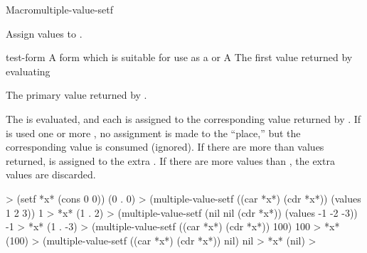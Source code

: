 \documentclass[10pt,twoside,english,pdftex]{article}
\begin{document}

\begin{functiondoc}{Macro}{multiple-value-setf}{%
  
 \returns{} } 
  
\fnsyntax

\fnpurpose Assign values to .

\fnpackage {}

\fnmodule {}

\fnargs
\begin{args}{test-form}
\arg[place] A form which is suitable for use as a
   or \nil 
\arg[form] A 
 The first value returned by evaluating 
\end{args}

\fnreturns The primary value returned by .

\fndescription
% 
The  is evaluated, and each  is assigned to the
corresponding value returned by .  If \nil{} is used one or more
, no assignment is made to the \nil{} ``place,'' but the
corresponding value is consumed (ignored). If there are more 
than values returned, \nil{} is assigned to the extra . If there
are more values than , the extra values are discarded.

\fnexamples
%
\W\supp
\begin{example}
  > (setf *x* (cons 0 0))
  (0 . 0)
  > (multiple-value-setf ((car *x*) (cdr *x*)) (values 1 2 3))
  1
  > *x*
  (1 . 2)\goodpagebreak
  > (multiple-value-setf (nil nil (cdr *x*)) (values -1 -2 -3))
  -1
  > *x*
  (1 . -3)\goodpagebreak
  > (multiple-value-setf ((car *x*) (cdr *x*)) 100)
  100
  > *x*
  (100)\goodpagebreak
  > (multiple-value-setf ((car *x*) (cdr *x*)) nil)
  nil
  > *x*
  (nil)\goodpagebreak
>
\end{example}

\end{functiondoc}

\end{document}
